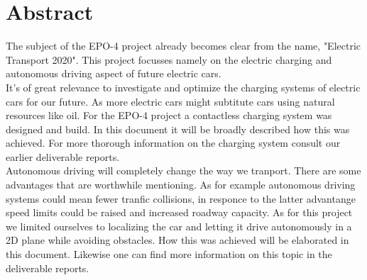 \documentclass[11pt,titlepage]{report}
\begin{document}
\section*{Abstract}
The subject of the EPO-4 project already becomes clear from the name, "Electric Transport 2020". This project focusses namely on the electric charging and autonomous driving aspect of future electric cars. \\
 It's of great relevance to investigate and optimize the charging systems of electric cars for our future. As more electric cars might subtitute cars using natural resources like oil. For the EPO-4 project a contactless charging system was designed and build. In this document it will be broadly described how this was achieved. For more thorough information on the charging system consult our earlier deliverable reports. \\
 Autonomous driving will completely change the way we tranport. There are some advantages that are worthwhile mentioning. As for example autonomous driving systems could mean fewer tranfic collisions, in responce to the latter advantange speed limits could be raised and increased roadway capacity. As for this project we limited ourselves to localizing the car and letting it drive autonomously in a 2D plane while avoiding obstacles. How this was achieved will be elaborated in this document. Likewise one can find more information on this topic in the deliverable reports. 
 
\end{document}
